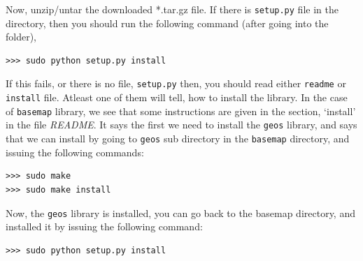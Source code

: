 \documentclass[10pt]{book}
\begin{document}
Now, unzip/untar the downloaded *.tar.gz file. If there is \verb"setup.py" file in the directory, then you should run the following command (after going into the folder),
\beforeverb \begin{verbatim}
>>> sudo python setup.py install
\end{verbatim} \afterverb
If this fails, or there is no file, \verb"setup.py" then, you should read either \verb"readme" or \verb"install" file. Atleast one of them will tell, how to install the library. In the case of \verb"basemap" library, we see that some instructions are given in the section, `install' in the file \emph{README}. It says the first we need to install the \verb"geos" library, and says that we can install by going to \verb"geos" sub directory in the \verb"basemap" directory, and issuing the following commands:

\beforeverb \begin{verbatim}
>>> sudo make
>>> sudo make install
\end{verbatim} \afterverb

Now, the \verb"geos" library is installed, you can go back to the basemap directory, and installed it by issuing the following command:

\beforeverb \begin{verbatim}
>>> sudo python setup.py install
\end{verbatim} \afterverb


\printindex
\end{document}
